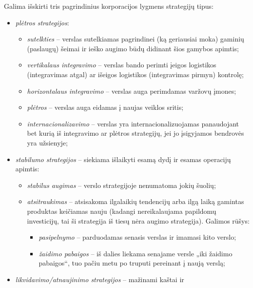 Galima išskirti tris pagrindinius korporacijos lygmens strategijų tipus:
\begin{itemize}
  \item \emph{plėtros strategijos}:
    \begin{itemize}
      \item \emph{sutelkties} – verslas sutelkiamas pagrindinei (ką 
        geriausiai moka) gaminių (paslaugų) šeimai ir ieško augimo būdų
        didinant šios gamybos apimtis;
      \item \emph{vertikalaus integravimo} – verslas bando perimti
        įeigos logistikos (integravimas atgal) ar išeigos logistikos
        (integravimas pirmyn) kontrolę;
      \item \emph{horizontalaus integravimo} – verslas auga perimdamas
        varžovų įmones;
      \item \emph{plėtros} – verslas auga eidamas į naujas veiklos sritis;
      \item \emph{internacionalizavimo} – verslas yra 
        internacionalizuojamas panaudojant bet kurią iš integravimo ar
        plėtros strategijų, jei jo įsigyjamos bendrovės yra užsienyje;
    \end{itemize}
  \item \emph{stabilumo strategijos} – siekiama išlaikyti esamą dydį ir
    esamas operacijų apimtis:
    \begin{itemize}
      \item \emph{stabilus augimas} – verslo strategijoje nenumatoma jokių
        šuolių;
      \item \emph{atsitraukimas}  
        – atsisakoma ilgalaikių 
        tendencijų arba ilgą laiką gamintas produktas keičiamas nauju 
        (kadangi nereikalaujama papildomų investicijų, tai ši strategija 
        iš tiesų nėra augimo strategija). Galimos rūšys:
        \begin{itemize}
          \item \emph{pasipelnymo}  – parduodamas senasis
            verslas ir imamasi kito verslo;
          \item \emph{žaidimo pabaigos}  – iš dalies 
            liekama senajame versle „iki žaidimo pabaigos“, tuo pačiu
            metu po truputi pereinant į naują verslą;
        \end{itemize}
    \end{itemize}
  \item \emph{likvidavimo/atnaujinimo strategijos} – mažinami kaštai ir

\end{itemize}
